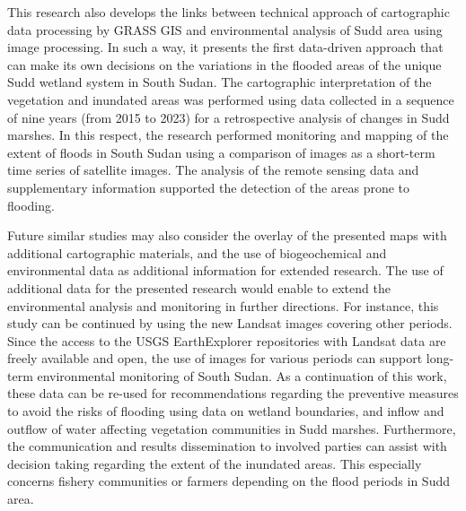 \documentclass[analytics,article,submit,pdftex,moreauthors]{Definitions/mdpi}
\begin{document}
This research also develops the links between technical approach of cartographic data processing by GRASS GIS and environmental analysis of Sudd area using image processing. In such a way, it presents the first data-driven approach that can make its own decisions on the variations in the flooded areas of the unique Sudd wetland system in South Sudan. The cartographic interpretation of the vegetation and inundated areas was performed using data collected in a sequence of nine years (from 2015 to 2023) for a retrospective analysis of changes in Sudd marshes. In this respect, the research performed monitoring and mapping of the extent of floods in South Sudan using a comparison of images as a short-term time series of satellite images. The analysis of the remote sensing data and supplementary information supported the detection of the areas prone to flooding. 

Future similar studies may also consider the overlay of the presented maps with additional cartographic materials, and the use of biogeochemical and environmental data as additional information for extended research. The use of additional data for the presented research would enable to extend the environmental analysis and monitoring in further directions. For instance, this study can be continued by using the new Landsat images covering other periods. Since the access to the USGS EarthExplorer repositories with Landsat data are freely available and open, the use of images for various periods can support long-term environmental monitoring of South Sudan. As a continuation of this work, these data can be re-used for recommendations regarding the preventive measures to avoid the risks of flooding using data on wetland boundaries, and inflow and outflow of water affecting vegetation communities in Sudd marshes. Furthermore, the communication and results dissemination to involved parties can assist with decision taking regarding the extent of the inundated areas. This especially concerns fishery communities or farmers depending on the flood periods in Sudd area. 





\end{document}

